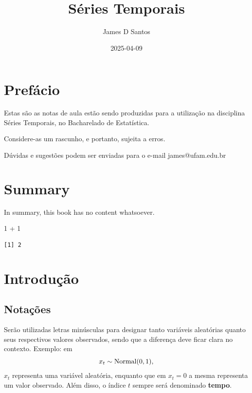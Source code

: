 \documentclass[
  letterpaper,
  DIV=11,
  numbers=noendperiod]{scrartcl}
\title{Séries Temporais}
\author{James D Santos}
\date{2025-04-09}
\newenvironment{Shaded}{\begin{snugshade}}{\end{snugshade}}
\newcommand{\DecValTok}[1]{\textcolor[rgb]{0.68,0.00,0.00}{#1}}
\newcommand{\SpecialCharTok}[1]{\textcolor[rgb]{0.37,0.37,0.37}{#1}}
\renewcommand*\contentsname{Table of contents}
\newcommand\contentsname{Table of contents}
\theoremstyle{definition}
\theoremstyle{definition}
\theoremstyle{plain}
\theoremstyle{plain}
\theoremstyle{remark}
\begin{document}
\maketitle

\renewcommand*\contentsname{Table of contents}
{
\setcounter{tocdepth}{2}
\tableofcontents
}


\chapter*{Prefácio}\label{prefuxe1cio}


Estas são as notas de aula estão sendo produzidas para a utilização na
disciplina Séries Temporais, no Bacharelado de Estatística.

Considere-as um rascunho, e portanto, sujeita a erros.

Dúvidas e sugestões podem ser enviadas para o e-mail james@ufam.edu.br


\chapter{Summary}\label{summary}

In summary, this book has no content whatsoever.

\begin{Shaded}
\begin{Highlighting}[]
\DecValTok{1} \SpecialCharTok{+} \DecValTok{1}
\end{Highlighting}
\end{Shaded}

\begin{verbatim}
[1] 2
\end{verbatim}


\chapter{Introdução}\label{introduuxe7uxe3o}

\section{Notações}\label{notauxe7uxf5es}

Serão utilizadas letras minúsculas para designar tanto variáveis
aleatórias quanto seus respectivos valores observados, sendo que a
diferença deve ficar clara no contexto. Exemplo: em
\[x_t\sim\hbox{Normal}(0,1),\] \(x_t\) representa uma variável
aleatória, enquanto que em \(x_t=0\) a mesma representa um valor
observado. Além disso, o índice \(t\) sempre será denominado
\textbf{tempo}.
\end{document}
